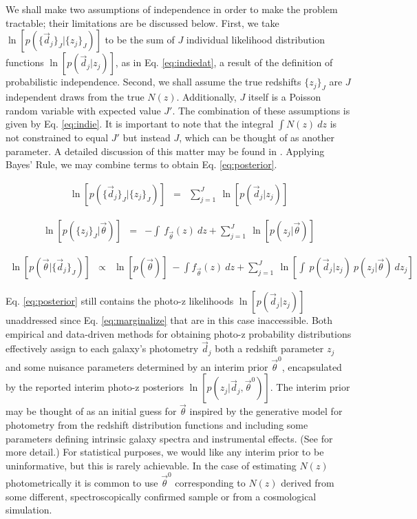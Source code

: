 \documentclass[preprint]{aastex}
\begin{document}
We shall make two assumptions of independence in order to make the problem 
tractable; their limitations are be discussed below.  First, we take 
$\ln[p(\{\vec{d}_{j}\}_{J}|\{z_{j}\}_{J})]$ to be the sum of $J$ individual 
likelihood distribution functions $\ln[p(\vec{d}_{j}|z_{j})]$, as in Eq. 
\ref{eq:indiedat}, a result of the definition of probabilistic independence.  
Second, we shall assume the true redshifts $\{z_{j}\}_{J}$ are $J$ independent 
draws from the true $N(z)$.  Additionally, $J$ itself is a Poisson random 
variable with expected value $J'$.  The combination of these assumptions is 
given by Eq. \ref{eq:indie}.  It is important to note that the integral $\int 
N(z)\ dz$ is not constrained to equal $J'$ but instead $J$, which can be 
thought of as another parameter.  A detailed discussion of this matter may be 
found in \citet{Foreman-Mackey2014}.  Applying Bayes' Rule, we may combine 
terms to obtain Eq. \ref{eq:posterior}.  

\begin{eqnarray}
\label{eq:indiedat}
\ln[p(\{\vec{d}_{j}\}_{J}|\{z_{j}\}_{J})] &=& \sum_{j=1}^{J}\ 
\ln[p(\vec{d}_{j}|z_{j})]
\end{eqnarray}

\begin{eqnarray}
\label{eq:indie}
\ln[p(\{z_{j}\}_{J}|\vec{\theta})] &=& -\int\ f_{\vec{\theta}}(z)\ dz +  
\sum_{j=1}^{J}\ \ln[p(z_{j}|\vec{\theta})]
\end{eqnarray}

\begin{eqnarray}
\label{eq:posterior}
\ln[p(\vec{\theta}|\{\vec{d}_{j}\}_{J})] &\propto& \ln[p(\vec{\theta})]\ -\int 
f_{\vec{\theta}}(z)\ dz + \sum_{j=1}^{J}\ \ln\left[\int\ p(\vec{d}_{j}|z_{j})\ 
p(z_{j}|\vec{\theta})\ dz_{j}\right]
\end{eqnarray}

Eq. \ref{eq:posterior} still contains the photo-z likelihoods 
$\ln[p(\vec{d}_{j}|z_{j})]$ unaddressed since Eq. \ref{eq:marginalize} that are 
in this case inaccessible.  Both empirical and data-driven methods for 
obtaining photo-z probability distributions effectively assign to each galaxy's 
photometry $\vec{d}_{j}$ both a redshift parameter $z_{j}$ and some nuisance 
parameters determined by an interim prior $\vec{\theta}^{0}$, encapsulated by 
the reported interim photo-z posteriors 
$\ln[p(z_{j}|\vec{d}_{j},\vec{\theta}^{0})]$.  The interim prior may be thought 
of as an initial guess for $\vec{\theta}$ inspired by the generative model for 
photometry from the redshift distribution functions and including some 
parameters defining intrinsic galaxy spectra and instrumental effects. (See 
\citet{Benitez2000} for more detail.)  For statistical purposes, we would like 
any interim prior to be uninformative, but this is rarely achievable.  In the 
case of estimating $N(z)$ photometrically it is common to use 
$\vec{\theta}^{0}$ corresponding to $N(z)$ derived from some different, 
spectroscopically confirmed sample or from a cosmological simulation.
\end{document}
